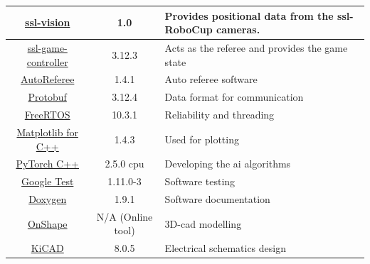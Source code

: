 \begin{table}[H]
\begin{tabularx}{\textwidth}{|c|c|X|}
		\href{https://github.com/RoboCup-SSL/ssl-vision}{ssl-vision}                   & 1.0                             & Provides positional data from the \acs{ssl}-RoboCup cameras.     \\ \hline
		\href{https://github.com/RoboCup-SSL/ssl-game-controller}{ssl-game-controller} & 3.12.3                          & Acts as the referee and provides the game state                  \\ \hline
		\href{https://github.com/TIGERs-Mannheim/AutoReferee}{AutoReferee}             & 1.4.1                           & Auto referee software                                            \\ \hline
		\href{https://github.com/protocolbuffers/protobuf}{Protobuf}                   & 3.12.4                          & Data format for communication                                    \\ \hline
		\href{https://freertos.org/}{FreeRTOS}                                         & 10.3.1                          & Reliability and threading                                        \\ \hline
		\href{https://matplotlib-cpp.readthedocs.io/en/latest/}{Matplotlib for C++}    & 1.4.3                           & Used for plotting                                                \\ \hline
		\href{https://pytorch.org/cppdocs/}{PyTorch C++}                               & 2.5.0 \acs{cpu}                 & Developing the \acs{ai} algorithms                               \\ \hline
		\href{https://google.github.io/googletest/}{Google Test}                       & 1.11.0-3                        & Software testing                                                 \\ \hline
		\href{https://www.doxygen.nl/index.html}{Doxygen}                              & 1.9.1                           & Software documentation                                           \\ \hline
		\href{https://www.onshape.com/en/}{OnShape}                                    & N/A (Online tool)               & 3D-\acs{cad} modelling                                           \\ \hline
		\href{https://www.kicad.org/}{KiCAD}                                           & 8.0.5                           & Electrical schematics design                                     \\ \hline
	\end{tabularx}
\end{table}

